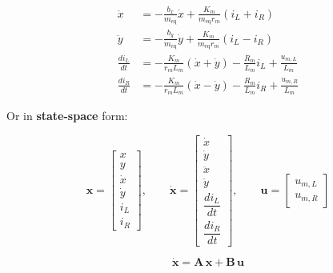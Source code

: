 \begin{equation}
\label{eq:state_equations}
\boxed{
\begin{aligned}
\ddot x &= -\frac{b_x}{m_{\mathrm{eq}}}\dot x + \frac{K_m}{m_{\mathrm{eq}} r_m}\left(i_L + i_R\right) \\
\ddot y &= -\frac{b_y}{m_{\mathrm{eq}}}\dot y + \frac{K_m}{m_{\mathrm{eq}} r_m}\left(i_L - i_R\right) \\
\frac{di_L}{dt} &= -\frac{K_m}{r_m L_m}\left(\dot x + \dot y\right) - \frac{R_m}{L_m} i_L + \frac{u_{m,L}}{L_m} \\
\frac{di_R}{dt} &= -\frac{K_m}{r_m L_m}\left(\dot x - \dot y\right) - \frac{R_m}{L_m} i_R + \frac{u_{m,R}}{L_m}
\end{aligned}}
\end{equation}

Or in \textbf{state-space} form:

\begin{equation*}
\mathbf{x} = \begin{bmatrix} x \\ y \\ \dot x \\ \dot y \\ i_L \\ i_R \end{bmatrix},
\qquad
\dot{\mathbf{x}} = \begin{bmatrix} \dot x \\ \dot y \\ \ddot x \\ \ddot y \\ \dfrac{di_L}{dt} \\[1ex] \dfrac{di_R}{dt} \end{bmatrix},
\qquad
\mathbf{u} = \begin{bmatrix} u_{m,L} \\ u_{m,R} \end{bmatrix}
\end{equation*}

\begin{equation}
\label{eq:state_space}
\dot{\mathbf{x}} = \mathbf{A}\,\mathbf{x} + \mathbf{B}\,\mathbf{u}
\end{equation}

